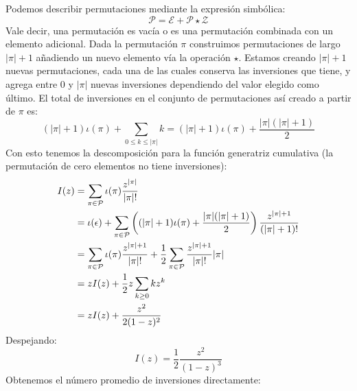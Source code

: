   Podemos describir permutaciones mediante la expresión simbólica:
  \begin{equation}
    \label{eq:P-class}
    \mathcal{P}
      = \mathcal{E} + \mathcal{P} \star \mathcal{Z}
  \end{equation}
  Vale decir,
  una permutación es vacía
  o es una permutación combinada con un elemento adicional.
  Dada la permutación \(\pi\)
  construimos permutaciones de largo \(\lvert \pi \rvert + 1\)
  añadiendo un nuevo elemento vía la operación \(\star\).
  Estamos creando \(\lvert \pi \rvert + 1\) nuevas permutaciones,
  cada una de las cuales conserva las inversiones que tiene,
  y agrega entre \(0\) y \(\lvert \pi \rvert\) nuevas inversiones
  dependiendo del valor elegido como último.
  El total de inversiones en el conjunto de permutaciones así creado
  a partir de \(\pi\) es:
  \begin{equation}
    \label{eq:iota-decomposed}
    (\lvert \pi \rvert + 1) \iota(\pi)
      + \sum_{0 \le k \le \lvert \pi \rvert} k
      = (\lvert \pi \rvert + 1) \iota(\pi)
	  +  \frac{\lvert \pi \rvert ( \lvert \pi \rvert + 1)}{2}
  \end{equation}
  Con esto tenemos la descomposición para la función generatriz cumulativa
  (la permutación de cero elementos no tiene inversiones):
  \begin{align}
    I(z)
      &= \sum_{\pi \in \mathcal{P}}
	   \iota(\pi) \frac{z^{\lvert \pi \rvert}}{\lvert \pi \rvert !}
	       \label{eq:Inv-definition} \\
      &= \iota(\epsilon)
	   + \sum_{\pi \in \mathcal{P}}
	       \left(
		 (\lvert \pi \rvert + 1) \iota(\pi)
		     +	\frac{\lvert \pi \rvert ( \lvert \pi \rvert + 1)}{2}
	       \right)
	       \frac{z^{\lvert \pi \rvert + 1}}{(\lvert \pi \rvert + 1)!}
		   \label{eq:Inv-decomposed} \\
      &= \sum_{\pi \in \mathcal{P}}
	   \iota(\pi) \frac{z^{\lvert \pi \rvert + 1}}{\lvert \pi \rvert !}
	   + \frac{1}{2}
	       \sum_{\pi \in \mathcal{P}}
		 \frac{z^{\lvert \pi \rvert + 1}}{\lvert \pi \rvert !}
		 \lvert \pi \rvert \notag \\
      &= z I(z) + \frac{1}{2} z \sum_{k \ge 0} k z^k \notag \\
      &= z I(z) + \frac{z^2}{2 (1 - z)^2}
  \end{align}
  Despejando:
  \begin{equation}
    \label{eq:Inv-explicit}
    I(z)
      = \frac{1}{2} \frac{z^2}{(1 - z)^3}
  \end{equation}
  Obtenemos el número promedio de inversiones directamente:%
